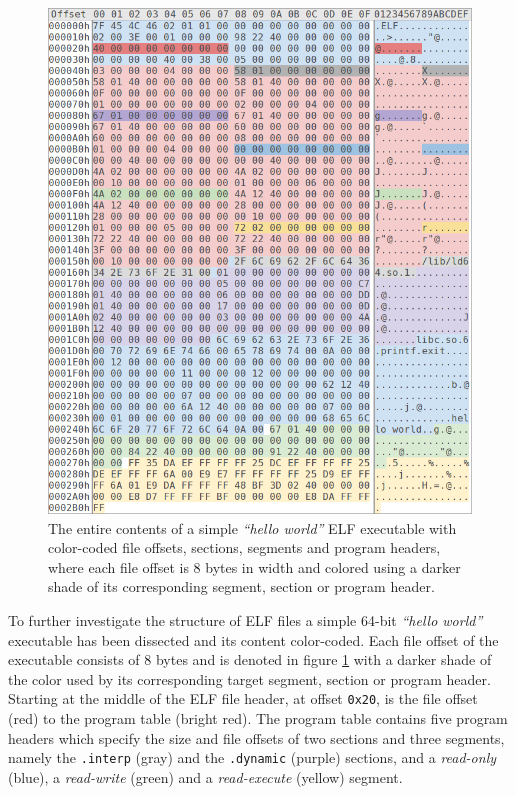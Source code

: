 \documentclass[12pt, a4paper]{article}
\begin{document}
\begin{figure}[htbp]
	\begin{center}
		\includegraphics[width=\textwidth]{inc/elf_dissection.png}
		\caption{The entire contents of a simple \textit{``hello world''} ELF executable with color-coded file offsets, sections, segments and program headers, where each file offset is 8 bytes in width and colored using a darker shade of its corresponding segment, section or program header.}
		\label{elf_dissection}
	\end{center}
\end{figure}

To further investigate the structure of ELF files a simple 64-bit \textit{``hello world''} executable has been dissected and its content color-coded. Each file offset of the executable consists of 8 bytes and is denoted in figure \ref{elf_dissection} with a darker shade of the color used by its corresponding target segment, section or program header. Starting at the middle of the ELF file header, at offset \texttt{0x20}, is the file offset (red) to the program table (bright red). The program table contains five program headers which specify the size and file offsets of two sections and three segments, namely the \texttt{.interp} (gray) and the \texttt{.dynamic} (purple) sections, and a \textit{read-only} (blue), a \textit{read-write} (green) and a \textit{read-execute} (yellow) segment.
\end{document}
